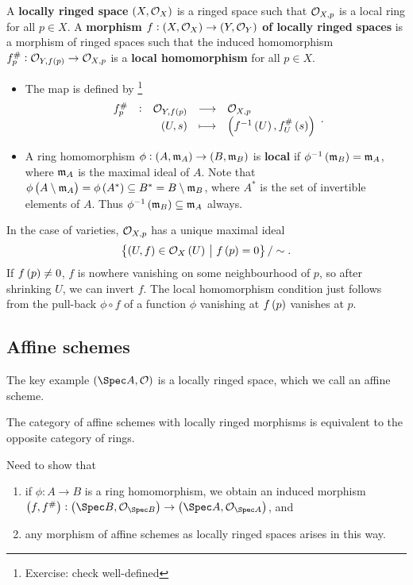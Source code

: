 \begin{definition*}
A \textbf{locally ringed space} $ \br{X, \OOO_X} $ is a ringed space such that $ \mathcal{O}_{X, p} $ is a local ring for all $ p \in X $. A \textbf{morphism $ f : \br{X, \OOO_X} \to \br{Y, \OOO_Y} $ of locally ringed spaces} is a morphism of ringed spaces such that the induced homomorphism $ f_p^\# : \OOO_{Y, f\br{p}} \to \OOO_{X, p} $ is a \textbf{local homomorphism} for all $ p \in X $.
\begin{itemize}
\item The map is defined by \footnote{Exercise: check well-defined}
$$ \function[f_p^\#]{\OOO_{Y, f\br{p}}}{\OOO_{X, p}}{\br{U, s}}{\br{f^{-1}\br{U}, f_U^\#\br{s}}}. $$
\item A ring homomorphism $ \phi : \br{A, \mmm_A} \to \br{B, \mmm_B} $ is \textbf{local} if $ \phi^{-1}\br{\mmm_B} = \mmm_A $, where $ \mathfrak{m}_A $ is the maximal ideal of $ A $. Note that $ \phi\br{A \setminus \mmm_A} = \phi\br{A^*} \subseteq B^* = B \setminus \mmm_B $, where $ A^* $ is the set of invertible elements of $ A $. Thus $ \phi^{-1}\br{\mmm_B} \subseteq \mmm_A $ always.
\end{itemize}
\end{definition*}

\begin{example*}
In the case of varieties, $ \mathcal{O}_{X, p} $ has a unique maximal ideal
$$ \cbr{\br{U, f} \in \OOO_X\br{U} \st f\br{p} = 0} / \sim. $$
If $ f\br{p} \ne 0 $, $ f $ is nowhere vanishing on some neighbourhood of $ p $, so after shrinking $ U $, we can invert $ f $. The local homomorphism condition just follows from the pull-back $ \phi \circ f $ of a function $ \phi $ vanishing at $ f\br{p} $ vanishes at $ p $.
\end{example*}

\subsection{Affine schemes}


The key example $ \br{\Spec A, \OOO} $ is a locally ringed space, which we call an affine scheme.

\begin{theorem}
The category of affine schemes with locally ringed morphisms is equivalent to the opposite category of rings.
\end{theorem}

Need to show that
\begin{enumerate}
\item if $ \phi : A \to B $ is a ring homomorphism, we obtain an induced morphism $ \br{f, f^\#} : \br{\Spec B, \OOO_{\Spec B}} \to \br{\Spec A, \OOO_{\Spec A}} $, and
\item any morphism of affine schemes as locally ringed spaces arises in this way.
\end{enumerate}

